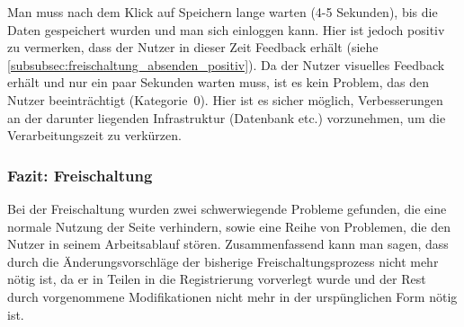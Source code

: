 {
Man muss nach dem Klick auf Speichern lange warten (4-5 Sekunden), bis die Daten gespeichert wurden und man sich einloggen kann. Hier ist jedoch positiv zu vermerken, dass der Nutzer in dieser Zeit Feedback erhält (siehe \ref{subsubsec:freischaltung_absenden_positiv}).
}
{
Da der Nutzer visuelles Feedback erhält und nur ein paar Sekunden warten muss, ist es kein Problem, das den Nutzer beeinträchtigt (Kategorie~0).
}
{
Hier ist es sicher möglich, Verbesserungen an der darunter liegenden Infrastruktur (Datenbank etc.) vorzunehmen, um die Verarbeitungszeit zu verkürzen.
}
\label{prob:frei:speichern}

\subsubsection*{Fazit: Freischaltung}
Bei der Freischaltung wurden zwei schwerwiegende Probleme gefunden, die eine normale Nutzung der Seite verhindern, sowie eine Reihe von Problemen, die den Nutzer in seinem Arbeitsablauf stören. Zusammenfassend kann man sagen, dass durch die Änderungsvorschläge der bisherige Freischaltungsprozess nicht mehr nötig ist, da er in Teilen in die Registrierung vorverlegt wurde und der Rest durch vorgenommene Modifikationen nicht mehr in der urspünglichen Form nötig ist.